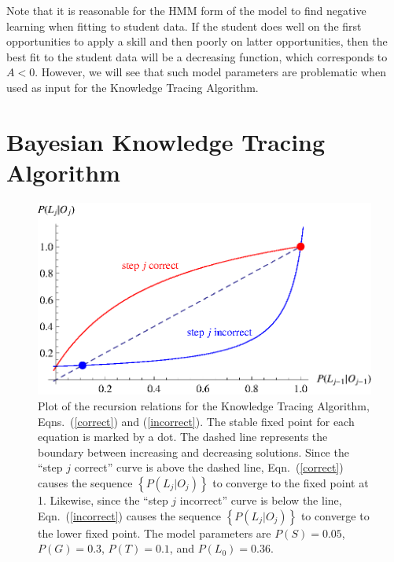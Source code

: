 \documentclass[jedm,acmnow]{acmtrans2m}
\begin{document}
Note that it is reasonable for the HMM form of the model to find
negative learning when fitting to student data.  If the student does
well on the first opportunities to apply a skill and then poorly on latter
opportunities, then the best fit to the student data will be a
decreasing function, which corresponds to $A<0$.  However,
we will see that such model parameters are problematic when
used as input for the Knowledge Tracing Algorithm.

\section{Bayesian Knowledge Tracing Algorithm}

\begin{figure}
\centering\includegraphics{p-recursion.eps}
\caption{
  Plot of the recursion relations for the Knowledge Tracing Algorithm, 
  Eqns.~(\ref{correct}) and (\ref{incorrect}).
  The stable fixed point for each equation is marked
  by a dot.  The dashed line represents the boundary between
  increasing and decreasing solutions.  Since the ``step $j$ correct'' curve is above the
  dashed line, Eqn.~(\ref{correct}) causes the sequence $\left\{P(L_j|O_j)\right\}$ to converge to
  the fixed point at 1.  Likewise, since the ``step $j$ incorrect''
  curve is below the line, Eqn.~(\ref{incorrect}) causes the sequence $\left\{P(L_j|O_j)\right\}$
  to converge to the lower fixed point.
  The model parameters are $P(S)=0.05$, $P(G)=0.3$,  $P(T)=0.1$, and $P(L_0)=0.36$.
 }
 \label{p-recursion}
\end{figure}
\end{document}
